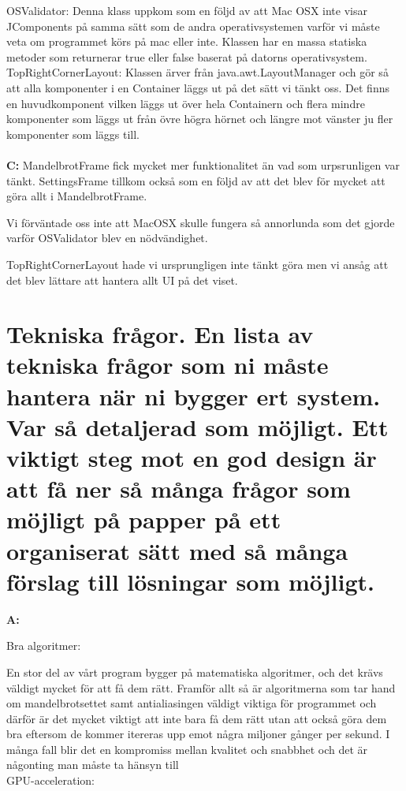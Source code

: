 \documentclass[11pt]{article} %
\begin{document}
OSValidator: Denna klass uppkom som en följd av att Mac OSX inte visar JComponents på samma sätt som de andra operativsystemen varför vi måste veta om programmet körs på mac eller inte. Klassen har en massa statiska metoder som returnerar true eller false baserat på datorns operativsystem.\\

TopRightCornerLayout: Klassen ärver från java.awt.LayoutManager och gör så att alla komponenter i en Container läggs ut på det sätt vi tänkt oss. Det finns en huvudkomponent vilken läggs ut över hela Containern och flera mindre komponenter som läggs ut från övre högra hörnet och längre mot vänster ju fler komponenter som läggs till.\\
\\

{\bf C:} MandelbrotFrame fick mycket mer funktionalitet än vad som urpsrunligen var tänkt. SettingsFrame tillkom också som en följd av att det blev för mycket att göra allt i MandelbrotFrame.

Vi förväntade oss inte att MacOSX skulle fungera så annorlunda som det gjorde varför OSValidator blev en nödvändighet.

TopRightCornerLayout hade vi ursprungligen inte tänkt göra men vi ansåg att det blev lättare att hantera allt UI på det viset.

\section{Tekniska frågor. En lista av tekniska frågor som ni måste hantera när ni bygger ert system. Var så detaljerad som möjligt. Ett viktigt steg mot en god design är att få ner så många frågor som möjligt på papper på ett organiserat sätt med så många förslag till lösningar som möjligt.}

{\bf A:}

\noindent Bra algoritmer:

\noindent En stor del av vårt program bygger på matematiska algoritmer, och det krävs väldigt mycket för att få dem rätt. Framför allt så är algoritmerna som tar hand om mandelbrotsettet samt antialiasingen väldigt viktiga för programmet och därför är det mycket viktigt att inte bara få dem rätt utan att också göra dem bra eftersom de kommer itereras upp emot några miljoner gånger per sekund. 
I många fall blir det en kompromiss mellan kvalitet och snabbhet och det är någonting man måste ta hänsyn till \\

\noindent GPU-acceleration:
\end{document}
